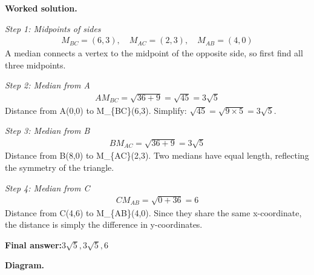 \documentclass[11pt]{article}
\begin{document}
\textbf{Worked solution.}

\textit{Step 1: Midpoints of sides}
\[\begin{gathered}
M_{BC} = (6, 3), \quad M_{AC} = (2, 3), \quad M_{AB} = (4, 0)
\end{gathered}\]
A median connects a vertex to the midpoint of the opposite side, so first find all three midpoints.

\textit{Step 2: Median from A}
\[\begin{gathered}
AM_{BC} = \sqrt{36+9} = \sqrt{45} = 3\sqrt{5}
\end{gathered}\]
Distance from A(0,0) to M\_\{BC\}(6,3). Simplify: \(\sqrt{45} = \sqrt{9 \times 5} = 3\sqrt{5}\).

\textit{Step 3: Median from B}
\[\begin{gathered}
BM_{AC} = \sqrt{36+9} = 3\sqrt{5}
\end{gathered}\]
Distance from B(8,0) to M\_\{AC\}(2,3). Two medians have equal length, reflecting the symmetry of the triangle.

\textit{Step 4: Median from C}
\[\begin{gathered}
CM_{AB} = \sqrt{0+36} = 6
\end{gathered}\]
Distance from C(4,6) to M\_\{AB\}(4,0). Since they share the same x-coordinate, the distance is simply the difference in y-coordinates.

\begin{answerbox}
\textbf{Final answer:}\quad \(\displaystyle 3\sqrt{5}, 3\sqrt{5}, 6\)
\end{answerbox}
\textbf{Diagram.}
\end{document}
